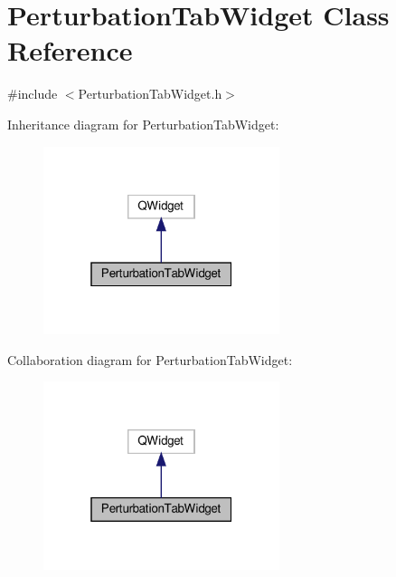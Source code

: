 \hypertarget{class_perturbation_tab_widget}{}\section{Perturbation\+Tab\+Widget Class Reference}
\label{class_perturbation_tab_widget}


{\ttfamily \#include $<$Perturbation\+Tab\+Widget.\+h$>$}



Inheritance diagram for Perturbation\+Tab\+Widget\+:
\nopagebreak
\begin{figure}[H]
\begin{center}
\leavevmode
\includegraphics[width=196pt]{class_perturbation_tab_widget__inherit__graph}
\end{center}
\end{figure}


Collaboration diagram for Perturbation\+Tab\+Widget\+:
\nopagebreak
\begin{figure}[H]
\begin{center}
\leavevmode
\includegraphics[width=196pt]{class_perturbation_tab_widget__coll__graph}
\end{center}
\end{figure}
